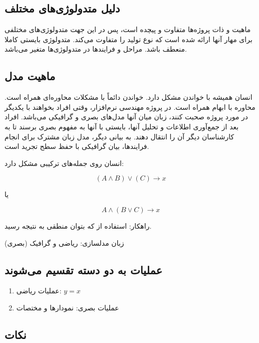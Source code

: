 \subsection{دلیل متدولوژی‌های مختلف}

ماهیت و ذات پروژه‌ها متفاوت و پیچده‌ است، پس در این جهت متدولوژی‌های مختلفی برای
مهار آنها ارائه شده است که نوع تولید را متفاوت می‌کند. متدولوژی بایستی کاملا
منعطف باشد. مراحل و فرایند‌ها در متدولوژی‌ها متغیر می‌باشد.

\subsection{ماهیت مدل}

انسان همیشه با خواندن مشکل دارد. خواندن دائماً با مشکلات محاوره‌ای همراه است.
محاوره با ابهام همراه است. در پروژه مهندسی نرم‌افزار، وقتی افراد بخواهند با
یکدیگر در مورد پروژه صحبت کنند، زبان میان آنها مدل‌های بصری و گرافیکی می‌باشد.
افراد بعد از جمع‌آوری اطلاعات و تحلیل آنها، بایستی با آنها به مفهوم بصری برسند
تا به کارشناسان دیگر آن را انتقال دهند. به بیانی دیگر، مدل زبان مشترک برای انجام
فرایند‌ها، بیان گرافیکی با حفظ سطح تجرید است.

انسان روی جمله‌های ترکیبی مشکل دارد: 

\begin{equation}
  (A \wedge  B)\vee (C) \rightarrow x
\end{equation}

یا

\begin{equation}
  A \wedge (B \vee C) \rightarrow x
\end{equation}

راهکار: استفاده از  که بتوان منطقی به نتیجه رسید.

زبان مدلسازی: ریاضی و گرافیک (بصری)

\subsection*{عملیات به دو دسته تقسیم می‌شوند}

\begin{enumerate}
  \item عملیات ریاضی: $y = x$
  \item عملیات بصری: نمودار‌ها و مختصات
\end{enumerate}

\subsection*{نکات}

